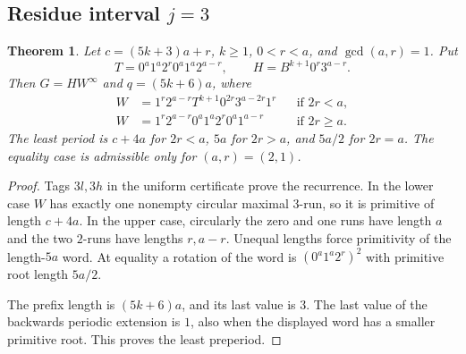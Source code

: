 \documentclass[11pt]{article}
\newtheorem{theorem}{Theorem}[section]
\theoremstyle{remark}\newtheorem{remark}[theorem]{Remark}
\newcommand{\per}{^{\infty}}
\begin{document}
\subsection{Residue interval \texorpdfstring{$j=3$}{j=3}}
\begin{theorem}\label{thm:third}
Let $c=(5k+3)a+r$, $k\ge1$, $0<r<a$, and $\gcd(a,r)=1$. Put
\[T=0^a1^a2^r0^a1^a2^{a-r},\qquad H=B^{k+1}0^r3^{a-r}.\]
Then $G=HW\per$ and $q=(5k+6)a$, where
\begin{align*}
W&=1^r2^{a-r}T^{k+1}0^{2r}3^{a-2r}1^r&&\text{if }2r<a,\\
W&=1^r2^{a-r}0^a1^a2^r0^a1^{a-r}&&\text{if }2r\ge a.
\end{align*}
The least period is $c+4a$ for $2r<a$, $5a$ for $2r>a$, and $5a/2$ for $2r=a$. The equality case is admissible only for $(a,r)=(2,1)$.
\end{theorem}
\begin{proof}
Tags $3l,3h$ in the uniform certificate prove the recurrence. In the lower case $W$ has exactly one nonempty circular maximal $3$-run, so it is primitive of length $c+4a$. In the upper case, circularly the zero and one runs have length $a$ and the two $2$-runs have lengths $r,a-r$. Unequal lengths force primitivity of the length-$5a$ word. At equality a rotation of the word is $(0^a1^a2^r)^2$ with primitive root length $5a/2$.

The prefix length is $(5k+6)a$, and its last value is $3$. The last value of the backwards periodic extension is $1$, also when the displayed word has a smaller primitive root. This proves the least preperiod.
\end{proof}
\end{document}
